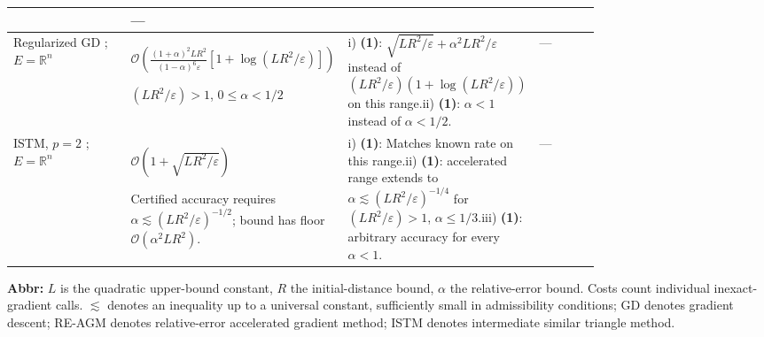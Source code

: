 \begin{table}[tp]
\begin{threeparttable}
\begin{tabularx}{\linewidth}{@{}>{\raggedright\arraybackslash}p{0.20\linewidth}>{\raggedright\arraybackslash}p{0.32\linewidth}>{\raggedright\arraybackslash}p{0.25\linewidth}>{\raggedright\arraybackslash}X@{}}
& --- \\
\midrule
Regularized GD \citep[Thm.~7.1, v1]{vasinGasnikov2026RelativeV1}; $E=\mathbb{R}^n$
& $\mathcal{O}\!\left(\frac{(1+\alpha)^2LR^2}{(1-\alpha)^6\varepsilon}[1+\log(LR^2/\varepsilon)]\right)$\par $(LR^2/\varepsilon)>1$, $0\le\alpha<1/2$
& i) \textbf{(1)}: $\sqrt{LR^2/\varepsilon}+\alpha^2LR^2/\varepsilon$ instead of $(LR^2/\varepsilon)(1+\log (LR^2/\varepsilon))$ on this range.\newline ii) \textbf{(1)}: $\alpha<1$ instead of $\alpha<1/2$.
& --- \\
\midrule
ISTM, $p=2$ \citep[Thm.~3.1, v1]{kornilovEtAl2023RelativeV1}; $E=\mathbb{R}^n$
& $\mathcal{O}\!(1+\sqrt{LR^2/\varepsilon})$\par Certified accuracy requires $\alpha\lesssim (LR^2/\varepsilon)^{-1/2}$; bound has floor $\mathcal{O}\!(\alpha^2LR^2)$.
& i) \textbf{(1)}: Matches known rate on this range.\newline ii) \textbf{(1)}: accelerated range extends to $\alpha\lesssim (LR^2/\varepsilon)^{-1/4}$ for $(LR^2/\varepsilon)>1$, $\alpha\le1/3$.\newline iii) \textbf{(1)}: arbitrary accuracy for every $\alpha<1$.
& --- \\
\bottomrule
\end{tabularx}
\begin{tablenotes}[flushleft]\footnotesize
\item[] \textbf{Abbr:} $L$ is the quadratic upper-bound constant, $R$ the initial-distance bound, $\alpha$ the relative-error bound. Costs count individual inexact-gradient calls. $\lesssim$ denotes an inequality up to a universal constant, sufficiently small in admissibility conditions; GD denotes gradient descent; RE-AGM denotes relative-error accelerated gradient method; ISTM denotes intermediate similar triangle method.
\end{tablenotes}
\end{threeparttable}
\end{table}
\clearpage
